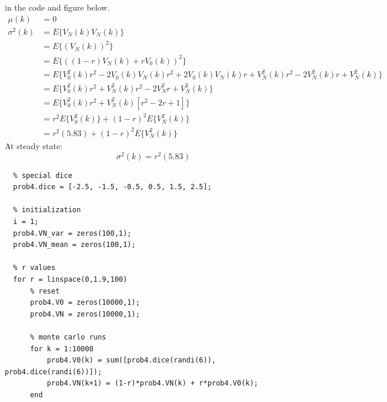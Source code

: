 \documentclass[11pt]{article}
\begin{document}
\begin{enumerate}[label=\textbf{\arabic*.}]
  in the code and figure below.
  \begin{equation*}
    \begin{split}
      \mu(k) &= 0 \\
      \sigma^2(k) &= E\{V_N(k)V_N(k)\} \\
      &= E\{(V_N(k))^2\} \\
      &= E\{((1-r)V_N(k)+rV_0(k))^2\} \\
      &= E\{V_0^2(k)r^2 - 2V_0(k)V_N(k)r^2 + 2V_0(k)V_N(k)r + V_N^2(k)r^2 - 2V_N^2(k)r + V_N^2(k)\} \\
      &= E\{V_0^2(k)r^2 + V_N^2(k)r^2 - 2V_N^2r + V_N^2(k)\} \\
      &= E\{V_0^2(k)r^2 + V_N^2(k)[r^2 - 2r + 1]\} \\
      &= r^2E\{V_0^2(k)\} + (1-r)^2E\{V_N^2(k)\} \\
      &= r^2(5.83) + (1-r)^2E\{V_N^2(k)\}
    \end{split}
  \end{equation*}
  At steady state:
  \begin{equation*}
    \sigma^2(k) = r^2(5.83)
  \end{equation*}
  \begin{lstlisting}
  % special dice
  prob4.dice = [-2.5, -1.5, -0.5, 0.5, 1.5, 2.5];

  % initialization
  i = 1;
  prob4.VN_var = zeros(100,1);
  prob4.VN_mean = zeros(100,1);

  % r values
  for r = linspace(0,1.9,100)
      % reset
      prob4.V0 = zeros(10000,1);
      prob4.VN = zeros(10000,1);

      % monte carlo runs
      for k = 1:10000
          prob4.V0(k) = sum([prob4.dice(randi(6)), prob4.dice(randi(6))]);
          prob4.VN(k+1) = (1-r)*prob4.VN(k) + r*prob4.V0(k);
      end
      

\end{lstlisting}
\end{enumerate}
\end{document}
